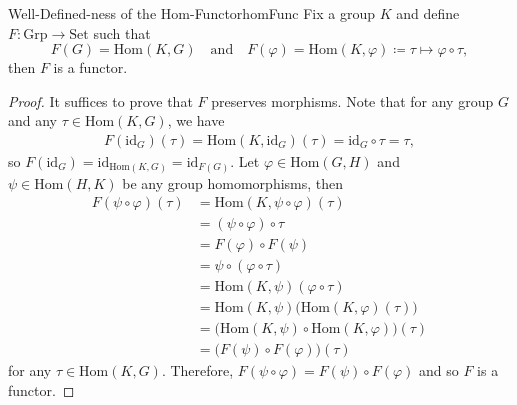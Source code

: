 \documentclass[math]{amznotes}
\theoremstyle{remark}
\newcommand{\0}{\mathbf{0}}
\newcommand{\1}{\mathbf{1}}
\begin{document}
\begin{probox}{Well-Defined-ness of the $\mathrm{Hom}$-Functor}{homFunc}
    Fix a group $K$ and define $F \colon \mathrm{Grp} \to \mathrm{Set}$ such that 
    \begin{equation*}
        F\left(G\right) = \mathrm{Hom}\left(K, G\right) \quad\textrm{and}\quad F\left(\varphi\right) = \mathrm{Hom}\left(K, \varphi\right) \coloneqq \tau \mapsto \varphi \circ \tau,
    \end{equation*}
    then $F$ is a functor.
    \tcblower
    \begin{proof}
        It suffices to prove that $F$ preserves morphisms. Note that for any group $G$ and any $\tau \in \mathrm{Hom}\left(K, G\right)$, we have 
        \begin{align*}
            F\left(\mathrm{id}_G\right)\left(\tau\right) = \mathrm{Hom}\left(K, \mathrm{id}_G\right)\left(\tau\right) = \mathrm{id}_G \circ \tau = \tau,
        \end{align*}
        so $F\left(\mathrm{id}_G\right) = \mathrm{id}_{\mathrm{Hom}\left(K, G\right)} = \mathrm{id}_{F\left(G\right)}$. Let $\varphi \in \mathrm{Hom}\left(G, H\right)$ and $\psi \in \mathrm{Hom}\left(H, K\right)$ be any group homomorphisms, then 
        \begin{align*}
            F\left(\psi \circ \varphi\right)\left(\tau\right) & = \mathrm{Hom}\left(K, \psi \circ \varphi\right)\left(\tau\right) \\
            & = \left(\psi \circ \varphi\right) \circ \tau \\
            & = F\left(\varphi\right) \circ F\left(\psi\right) \\
            & = \psi \circ \left(\varphi \circ \tau\right) \\
            & = \mathrm{Hom}\left(K, \psi\right)\left(\varphi \circ \tau\right) \\
            & = \mathrm{Hom}\left(K, \psi\right)\bigl(\mathrm{Hom}\left(K, \varphi\right)\left(\tau\right)\bigr) \\
            & = \bigl(\mathrm{Hom}\left(K, \psi\right) \circ \mathrm{Hom}\left(K, \varphi\right)\bigr)\left(\tau\right) \\
            & = \bigl(F\left(\psi\right) \circ F\left(\varphi\right)\bigr)\left(\tau\right)
        \end{align*}
        for any $\tau \in \mathrm{Hom}\left(K, G\right)$. Therefore, $F\left(\psi \circ \varphi\right) = F\left(\psi\right) \circ F\left(\varphi\right)$ and so $F$ is a functor.
    \end{proof}
\end{probox}
\end{document}
